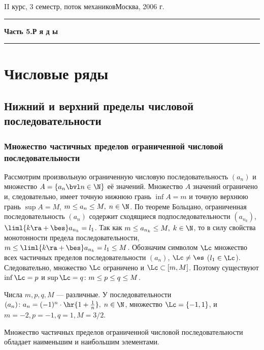 \documentclass[a4paper]{article}
\begin{document}
 {II курс, 3 семестр, поток
механиков}{Москва, 2006 г.}

\pagebreak


\dmvntrail
\medskip
\medskip
\medskip
\tableofcontents \pagebreak


\hrule\begin{center}\LARGE \bf Часть 5.\hfill Р я д
ы\end{center}\hrule

\section{Числовые ряды}

\subsection{Нижний и верхний пределы числовой последовательности}

\subsubsection{Множество частичных пределов ограниченной числовой
последовательности}

Рассмотрим произвольную ограниченную числовую последовательность
$(a_n)$ и множество $A=\{a_n \bvl n\in \N\}$ её значений. Множество
$A$ значений ограничено и, следовательно, имеет точную нижнюю грань
$\inf A = m$ и точную верхнюю грань $\sup A=M$, $m\le a_n \le M, \;
n\in \N$. По теореме Больцано, ограниченная последовательность
$(a_n)$ содержит сходящиеся подпоследовательности $(a_{n_k})$,
$\liml{k\ra +\bes} a_{n_k}=l_1$. Так как $m \le a_{n_k} \le M, \;
k\in\N$, то в силу свойства монотонности предела последовательности,
$m\le \liml{k\ra +\bes}a_{n_k}=l_1\le M$. Обозначим символом $\Lc$
множество всех частичных пределов последовательности $(a_n)$,
$\Lc\ne\es$ ($l_1\in\Lc$). Следовательно, множество $\Lc$ ограничено
и $\Lc \subset [m,M]$. Поэтому существуют $\inf\Lc=p$ и
$\sup\Lc=q\colon m\le p \le q \le M$.

\begin{note}
Числа $m,p,q,M$ --- различные. У последовательности $(a_n)\colon
a_n=(-1)^n \cdot \hr{1+\frac1n}, \; n\in\N$, множество
$\Lc=\{-1,1\}$, и $m=-2,p=-1,q=1,M=3/2$.
\end{note}

\begin{theorem}
Множество частичных пределов ограниченной числовой
последовательности обладает наименьшим и наибольшим элементами.
\end{theorem}
\end{document}
